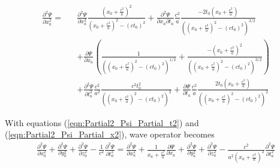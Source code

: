 \documentclass[prd,showpacs,preprint]{revtex4}
\begin{document}
\begin{eqnarray}
\frac{\partial^2 \Psi}{\partial x_0^2} =&& \frac{\partial^2 \Psi}{\partial x_a^2}\frac{(x_0+\frac{c^2}{a})^2}{(x_0+\frac{c^2}{a})^2-(ct_0)^2} + \frac{\partial^2 \Psi}{\partial x_a\partial t_a}\frac{c^2}{a}\frac{-2t_0(x_0+\frac{c^2}{a})}{((x_0+\frac{c^2}{a})^2-(ct_0)^2)^{3/2}}\nonumber\\
&& + \frac{\partial \Psi}{\partial x_a}(\frac{1}{((x_0+\frac{c^2}{a})^2-(ct_0)^2)^{1/2}} + \frac{-(x_0+\frac{c^2}{a})^2}{((x_0+\frac{c^2}{a})^2-(ct_0)^2)^{3/2}})\nonumber\\
&& + \frac{\partial^2 \Psi}{\partial t_a^2}\frac{c^2}{a^2}\frac{c^2t_0^2}{((x_0+\frac{c^2}{a})^2-(ct_0)^2)^2} + \frac{\partial \Psi}{\partial t_a}\frac{c^2}{a}\frac{2t_0(x_0+\frac{c^2}{a})}{((x_0+\frac{c^2}{a})^2-(ct_0)^2)^2}
\label{eqn:Partial2_Psi_Partial_x2}
\end{eqnarray}

With equations (\ref{eqn:Partial2_Psi_Partial_t2}) and (\ref{eqn:Partial2_Psi_Partial_x2}), wave operator becomes
\begin{eqnarray}
\frac{\partial^2 \Psi}{\partial x_0^2}+\frac{\partial^2 \Psi}{\partial y_0^2} + \frac{\partial^2 \Psi}{\partial z_0^2} - \frac{1}{c^2}\frac{\partial^2 \Psi}{\partial t_0^2} = \frac{\partial^2 \Psi}{\partial x_a^2} + \frac{1}{x_a+\frac{c^2}{a}}\frac{\partial \Psi}{\partial x_a} + \frac{\partial^2 \Psi}{\partial y_a^2} + \frac{\partial^2 \Psi}{\partial z_a^2} - \frac{c^2}{a^2(x_a+\frac{c^2}{a})^2}\frac{\partial^2 \Psi}{\partial t_a^2}
\label{eqn:Sint}
\end{eqnarray}
\end{document}
